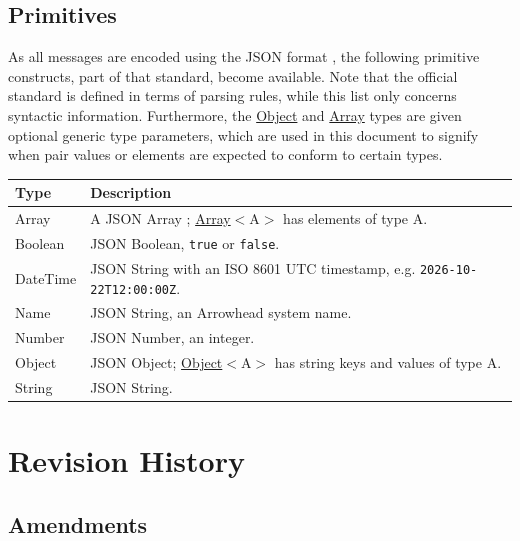 \documentclass[a4paper]{arrowhead}
\newcommand{\pdef}[1]{{\textcolor{ArrowheadGrey}{#1 \label{sec:model:primitives:#1} \label{sec:model:primitives:#1s}}}}
\newcommand{\pref}[1]{{\textcolor{ArrowheadGrey}{\hyperref[sec:model:primitives:#1]{#1}}}}
\begin{document}
\subsection{Primitives}
\label{sec:model:primitives}

As all messages are encoded using the JSON format \cite{rfc8259}, the following primitive constructs, part of that standard, become available.
Note that the official standard is defined in terms of parsing rules, while this list only concerns syntactic information.
Furthermore, the \pref{Object} and \pref{Array} types are given optional generic type parameters, which are used in this document to signify when pair values or elements are expected to conform to certain types.

\noindent\begin{tabularx}{\textwidth}{| p{4.6cm} | X |} \hline
\rowcolor{gray!33} Type & Description \\ \hline
\pdef{Array} & A JSON Array \cite{rfc8259}; \pref{Array}$<$A$>$ has elements of type A. \\ \hline
\pdef{Boolean} & JSON Boolean, \texttt{true} or \texttt{false}. \\ \hline
\pdef{DateTime} & JSON String with an ISO 8601 UTC timestamp, e.g. \texttt{2026-10-22T12:00:00Z}. \\ \hline
\pdef{Name} & JSON String, an Arrowhead system name. \\ \hline
\pdef{Number} & JSON Number, an integer. \\ \hline
\pdef{Object} & JSON Object; \pref{Object}$<$A$>$ has string keys and values of type A. \\ \hline
\pdef{String} & JSON String. \\ \hline
\end{tabularx}

\newpage




\newpage

\section{Revision History}
\subsection{Amendments}
\end{document}
